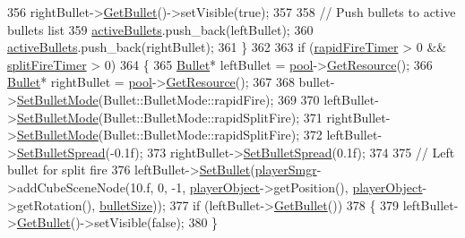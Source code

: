 \begin{DoxyCode}
356             rightBullet->\hyperlink{class_bullet_ab9ae469bacf54dfaa69e94b9ead0a908}{GetBullet}()->setVisible(\textcolor{keyword}{true});
357 
358             \textcolor{comment}{// Push bullets to active bullets list}
359             \hyperlink{_player_8cpp_a27bbbc62347638c3702e6da25c5c2e3b}{activeBullets}.push\_back(leftBullet);
360             \hyperlink{_player_8cpp_a27bbbc62347638c3702e6da25c5c2e3b}{activeBullets}.push\_back(rightBullet);
361         \}
362 
363         \textcolor{keywordflow}{if} (\hyperlink{class_player_ae4a6fe92f607de702ec714383324525f}{rapidFireTimer} > 0 && \hyperlink{class_player_a0d99bf8e9ae2d6e2079407a1686fc3a3}{splitFireTimer} > 0)
364         \{
365             \hyperlink{class_bullet}{Bullet}* leftBullet = \hyperlink{_player_8cpp_a5bf1425dbe612c76c16cd7b81bdf8b6e}{pool}->\hyperlink{class_bullet_pool_ae80aa07016b9635d7637ea5796393d29}{GetResource}();
366             \hyperlink{class_bullet}{Bullet}* rightBullet = \hyperlink{_player_8cpp_a5bf1425dbe612c76c16cd7b81bdf8b6e}{pool}->\hyperlink{class_bullet_pool_ae80aa07016b9635d7637ea5796393d29}{GetResource}();
367 
368             bullet->\hyperlink{class_bullet_a9988e27a0327a7ebca6b407c59661a54}{SetBulletMode}(Bullet::BulletMode::rapidFire);
369 
370             leftBullet->\hyperlink{class_bullet_a9988e27a0327a7ebca6b407c59661a54}{SetBulletMode}(Bullet::BulletMode::rapidSplitFire);
371             rightBullet->\hyperlink{class_bullet_a9988e27a0327a7ebca6b407c59661a54}{SetBulletMode}(Bullet::BulletMode::rapidSplitFire);
372             leftBullet->\hyperlink{class_bullet_a1fd596da19949b3dfdba7febd1b162f1}{SetBulletSpread}(-0.1f);
373             rightBullet->\hyperlink{class_bullet_a1fd596da19949b3dfdba7febd1b162f1}{SetBulletSpread}(0.1f);
374             
375             \textcolor{comment}{// Left bullet for split fire}
376             leftBullet->\hyperlink{class_bullet_a6b68bd110c7a9729c76ae4dc9906e7e7}{SetBullet}(\hyperlink{_player_8cpp_a1f903054d84bef85b61fea5eb6eca726}{playerSmgr}->addCubeSceneNode(10.f, 0, -1, 
      \hyperlink{_player_8cpp_a0dc161b57661226afd81ffc4ba4f21d9}{playerObject}->getPosition(), \hyperlink{_player_8cpp_a0dc161b57661226afd81ffc4ba4f21d9}{playerObject}->getRotation(), 
      \hyperlink{_player_8cpp_a396c7ac870d10132b062f2d3059dd23a}{bulletSize}));
377             \textcolor{keywordflow}{if} (leftBullet->\hyperlink{class_bullet_ab9ae469bacf54dfaa69e94b9ead0a908}{GetBullet}())
378             \{
379                 leftBullet->\hyperlink{class_bullet_ab9ae469bacf54dfaa69e94b9ead0a908}{GetBullet}()->setVisible(\textcolor{keyword}{false});
380             \}

\end{DoxyCode}
